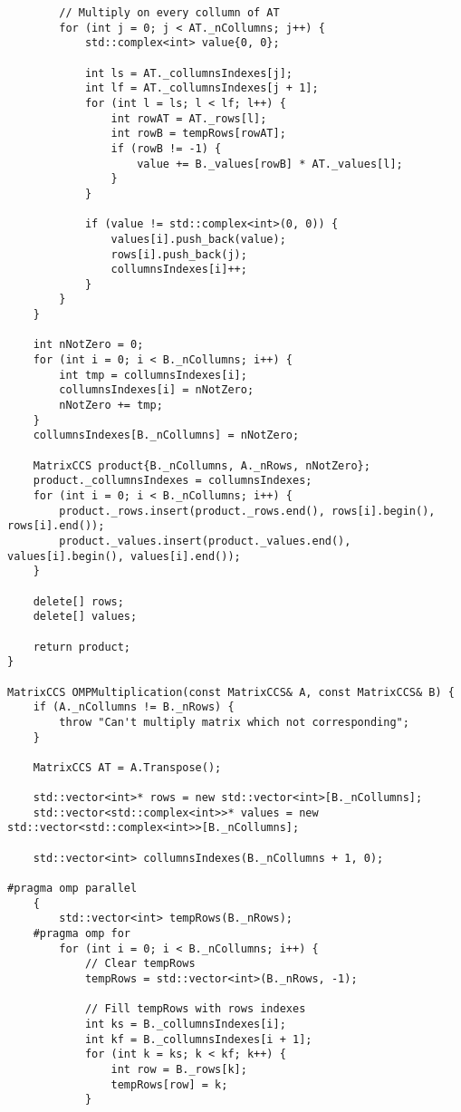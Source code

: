 \documentclass{report}
\begin{document}
\begin{lstlisting}
        // Multiply on every collumn of AT
        for (int j = 0; j < AT._nCollumns; j++) {
            std::complex<int> value{0, 0};

            int ls = AT._collumnsIndexes[j];
            int lf = AT._collumnsIndexes[j + 1];
            for (int l = ls; l < lf; l++) {
                int rowAT = AT._rows[l];
                int rowB = tempRows[rowAT];
                if (rowB != -1) {
                    value += B._values[rowB] * AT._values[l];
                }
            }

            if (value != std::complex<int>(0, 0)) {
                values[i].push_back(value);
                rows[i].push_back(j);
                collumnsIndexes[i]++;
            }
        }
    }

    int nNotZero = 0;
    for (int i = 0; i < B._nCollumns; i++) {
        int tmp = collumnsIndexes[i];
        collumnsIndexes[i] = nNotZero;
        nNotZero += tmp;
    }
    collumnsIndexes[B._nCollumns] = nNotZero;

    MatrixCCS product{B._nCollumns, A._nRows, nNotZero};
    product._collumnsIndexes = collumnsIndexes;
    for (int i = 0; i < B._nCollumns; i++) {
        product._rows.insert(product._rows.end(), rows[i].begin(), rows[i].end());
        product._values.insert(product._values.end(), values[i].begin(), values[i].end());
    }

    delete[] rows;
    delete[] values;

    return product;
}

MatrixCCS OMPMultiplication(const MatrixCCS& A, const MatrixCCS& B) {
    if (A._nCollumns != B._nRows) {
        throw "Can't multiply matrix which not corresponding";
    }

    MatrixCCS AT = A.Transpose();

    std::vector<int>* rows = new std::vector<int>[B._nCollumns];
    std::vector<std::complex<int>>* values = new std::vector<std::complex<int>>[B._nCollumns];

    std::vector<int> collumnsIndexes(B._nCollumns + 1, 0);

#pragma omp parallel
    {
        std::vector<int> tempRows(B._nRows);
    #pragma omp for
        for (int i = 0; i < B._nCollumns; i++) {
            // Clear tempRows
            tempRows = std::vector<int>(B._nRows, -1);

            // Fill tempRows with rows indexes
            int ks = B._collumnsIndexes[i];
            int kf = B._collumnsIndexes[i + 1];
            for (int k = ks; k < kf; k++) {
                int row = B._rows[k];
                tempRows[row] = k;
            }


\end{lstlisting}
\end{document}
